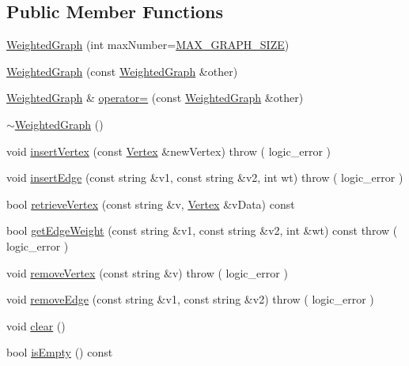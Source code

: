 \subsection*{\-Public \-Member \-Functions}
\begin{DoxyCompactItemize}
\item 
\hyperlink{class_weighted_graph_a9255d382e53db8d520ef1e2b63814c81}{\-Weighted\-Graph} (int max\-Number=\hyperlink{class_weighted_graph_af9b34017e5b494cd3aca2dbc8335fc3c}{\-M\-A\-X\-\_\-\-G\-R\-A\-P\-H\-\_\-\-S\-I\-Z\-E})
\item 
\hyperlink{class_weighted_graph_a294fd717db213e761dc0eb65bbfcb7ab}{\-Weighted\-Graph} (const \hyperlink{class_weighted_graph}{\-Weighted\-Graph} \&other)
\item 
\hyperlink{class_weighted_graph}{\-Weighted\-Graph} \& \hyperlink{class_weighted_graph_aa5982a507e944af28e4749cdc06543c6}{operator=} (const \hyperlink{class_weighted_graph}{\-Weighted\-Graph} \&other)
\item 
\hyperlink{class_weighted_graph_ad7b4a5c8206772f9f4fb5906c0d64923}{$\sim$\-Weighted\-Graph} ()
\item 
void \hyperlink{class_weighted_graph_aec4ef3455e3cc0d73a42e042adb7ac40}{insert\-Vertex} (const \hyperlink{class_weighted_graph_1_1_vertex}{\-Vertex} \&new\-Vertex)  throw ( logic\-\_\-error )
\item 
void \hyperlink{class_weighted_graph_a6f59ad223d921324c3ec629d0d6e4eea}{insert\-Edge} (const string \&v1, const string \&v2, int wt)  throw ( logic\-\_\-error )
\item 
bool \hyperlink{class_weighted_graph_a3afabc2236c99dac950f5161f715f114}{retrieve\-Vertex} (const string \&v, \hyperlink{class_weighted_graph_1_1_vertex}{\-Vertex} \&v\-Data) const 
\item 
bool \hyperlink{class_weighted_graph_ab136044e7378313087be69eb43e7f042}{get\-Edge\-Weight} (const string \&v1, const string \&v2, int \&wt) const   throw ( logic\-\_\-error )
\item 
void \hyperlink{class_weighted_graph_abaaa572a9b1a60ec3cd99d8db9d9590e}{remove\-Vertex} (const string \&v)  throw ( logic\-\_\-error )
\item 
void \hyperlink{class_weighted_graph_a1db455249fa7fedf70aa5683487a17df}{remove\-Edge} (const string \&v1, const string \&v2)  throw ( logic\-\_\-error )
\item 
void \hyperlink{class_weighted_graph_a26890ebf74d23821a6e4dbcf803b5002}{clear} ()
\item 
bool \hyperlink{class_weighted_graph_a1c03a0f68447cf88fed97c2076501702}{is\-Empty} () const 

\end{DoxyCompactItemize}
